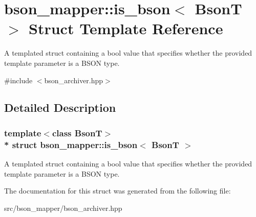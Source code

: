 \hypertarget{structbson__mapper_1_1is__bson}{}\section{bson\+\_\+mapper\+:\+:is\+\_\+bson$<$ BsonT $>$ Struct Template Reference}
\label{structbson__mapper_1_1is__bson}


A templated struct containing a bool value that specifies whether the provided template parameter is a B\+S\+ON type.  




{\ttfamily \#include $<$bson\+\_\+archiver.\+hpp$>$}



\subsection{Detailed Description}
\subsubsection*{template$<$class BsonT$>$\\*
struct bson\+\_\+mapper\+::is\+\_\+bson$<$ Bson\+T $>$}

A templated struct containing a bool value that specifies whether the provided template parameter is a B\+S\+ON type. 

The documentation for this struct was generated from the following file\+:\begin{DoxyCompactItemize}
\item 
src/bson\+\_\+mapper/bson\+\_\+archiver.\+hpp\end{DoxyCompactItemize}
